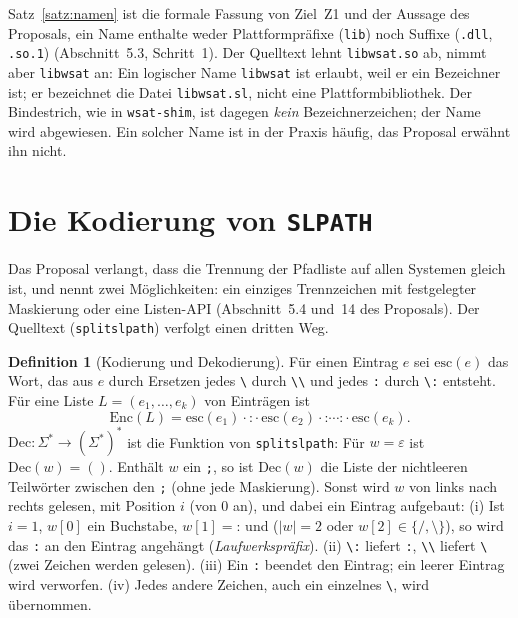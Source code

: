 \documentclass[a4paper,12pt,twoside]{report}
\DeclareRobustCommand{\_}{\ifmmode\mbox{\textunderscore}\else\textunderscore\allowbreak{}\fi}
\theoremstyle{definition}
\newtheorem{definition}{Definition}[chapter]
\begin{document}
Satz~\ref{satz:namen} ist die formale Fassung von Ziel~Z1 und der Aussage des Proposals, ein Name enthalte weder Plattformpräfixe (\texttt{lib}) noch Suffixe (\texttt{.dll}, \texttt{.so.1}) (Abschnitt~5.3, Schritt~1). Der Quelltext lehnt \texttt{libwsat.so} ab, nimmt aber \texttt{libwsat} an: Ein logischer Name \texttt{libwsat} ist erlaubt, weil er ein Bezeichner ist; er bezeichnet die Datei \texttt{libwsat.sl}, nicht eine Plattformbibliothek. Der Bindestrich, wie in \texttt{wsat-shim}, ist dagegen \emph{kein} Bezeichnerzeichen; der Name wird abgewiesen. Ein solcher Name ist in der Praxis häufig, das Proposal erwähnt ihn nicht.

\section{Die Kodierung von \texttt{SL\_PATH}}
\label{sec:slpath}

Das Proposal verlangt, dass die Trennung der Pfadliste auf allen Systemen gleich ist, und nennt zwei Möglichkeiten: ein einziges Trennzeichen mit festgelegter Maskierung oder eine Listen-API (Abschnitt~5.4 und~14 des Proposals). Der Quelltext (\texttt{split\_sl\_path}) verfolgt einen dritten Weg.

\begin{definition}[Kodierung und Dekodierung]
	\label{def:slpath}
	Für einen Eintrag $e$ sei $\mathrm{esc}(e)$ das Wort, das aus $e$ durch Ersetzen jedes \texttt{\textbackslash} durch \texttt{\textbackslash\textbackslash} und jedes \texttt{:} durch \texttt{\textbackslash:} entsteht. Für eine Liste $L=(e_1,\ldots,e_k)$ von Einträgen ist
	\[
	\mathrm{Enc}(L)=\mathrm{esc}(e_1)\cdot\texttt{:}\cdot\mathrm{esc}(e_2)\cdot\texttt{:}\cdots\texttt{:}\cdot\mathrm{esc}(e_k).
	\]
	$\mathrm{Dec}:\Sigma^*\to(\Sigma^*)^*$ ist die Funktion von \texttt{split\_sl\_path}: Für $w=\varepsilon$ ist $\mathrm{Dec}(w)=()$. Enthält $w$ ein \texttt{;}, so ist $\mathrm{Dec}(w)$ die Liste der nichtleeren Teilwörter zwischen den \texttt{;} (ohne jede Maskierung). Sonst wird $w$ von links nach rechts gelesen, mit Position $i$ (von $0$ an), und dabei ein Eintrag aufgebaut: (i) Ist $i=1$, $w[0]$ ein Buchstabe, $w[1]=\texttt{:}$ und ($|w|=2$ oder $w[2]\in\{\texttt{/},\texttt{\textbackslash}\}$), so wird das \texttt{:} an den Eintrag angehängt (\emph{Laufwerkspräfix}). (ii) \texttt{\textbackslash:} liefert \texttt{:}, \texttt{\textbackslash\textbackslash} liefert \texttt{\textbackslash} (zwei Zeichen werden gelesen). (iii) Ein \texttt{:} beendet den Eintrag; ein leerer Eintrag wird verworfen. (iv) Jedes andere Zeichen, auch ein einzelnes \texttt{\textbackslash}, wird übernommen.
\end{definition}
\end{document}
